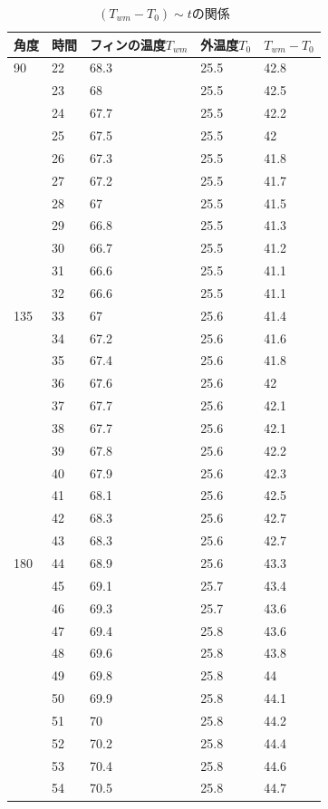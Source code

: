 \documentclass[twocolumn, 10pt,a4j]{jsarticle}
\begin{document}
\begin{enumerate}
      \begin{table}[]
        \centering
        \caption{$(T_{wm} - T_{0}) \sim tの関係$}
        \label{my-label}
        \footnotesize
        \begin{tabular}{lllll}
        角度 & 時間 & フィンの温度$T_{wm}$ & 外温度$T_{0}$ & $T_{wm}-T_{0}$ \\ \hline
        90&22&68.3&25.5&42.8  \\
      &23&68&25.5&42.5  \\
      &24&67.7&25.5&42.2  \\
      &25&67.5&25.5&42  \\
      &26&67.3&25.5&41.8  \\
      &27&67.2&25.5&41.7  \\
      &28&67&25.5&41.5  \\
      &29&66.8&25.5&41.3  \\
      &30&66.7&25.5&41.2  \\
      &31&66.6&25.5&41.1  \\
      &32&66.6&25.5&41.1  \\
      135&33&67&25.6&41.4  \\
      &34&67.2&25.6&41.6  \\
      &35&67.4&25.6&41.8  \\
      &36&67.6&25.6&42  \\
      &37&67.7&25.6&42.1  \\
      &38&67.7&25.6&42.1  \\
      &39&67.8&25.6&42.2  \\
      &40&67.9&25.6&42.3  \\
      &41&68.1&25.6&42.5  \\
      &42&68.3&25.6&42.7  \\
      &43&68.3&25.6&42.7  \\
      180&44&68.9&25.6&43.3  \\
      &45&69.1&25.7&43.4  \\
      &46&69.3&25.7&43.6  \\
      &47&69.4&25.8&43.6  \\
      &48&69.6&25.8&43.8  \\
      &49&69.8&25.8&44  \\
      &50&69.9&25.8&44.1  \\
      &51&70&25.8&44.2  \\
      &52&70.2&25.8&44.4  \\
      &53&70.4&25.8&44.6  \\
      &54&70.5&25.8&44.7  \\

\end{tabular}
\end{table}
\end{enumerate}
\end{document}
